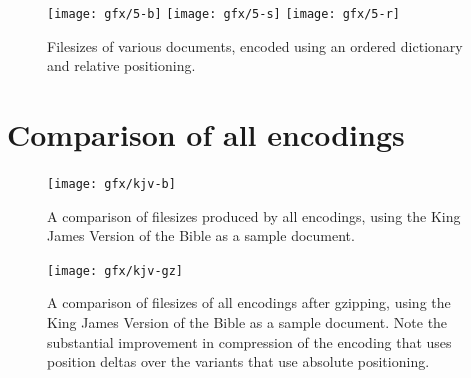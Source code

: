 \begin{figure}
  \begin{center}
  \texttt{[image: gfx/5-b]}
  \texttt{[image: gfx/5-s]}
  \texttt{[image: gfx/5-r]}
  \end{center}
  \caption[Filesizes of documents with an ordered dictionary and relative positioning]{Filesizes of various documents, encoded using an ordered dictionary and relative positioning.}
  \label{fig:size-deltas}
\end{figure}


\section{Comparison of all encodings}

\begin{figure}
  \begin{center}
  \texttt{[image: gfx/kjv-b]}
  \end{center}
  \caption[Comparison of filesizes from all encodings]{A comparison of filesizes produced by all encodings, using the King James Version of the Bible as a sample document.}
  \label{fig:size-all-b}
\end{figure}

\begin{figure}
  \begin{center}
  \texttt{[image: gfx/kjv-gz]}
  \end{center}
  \caption[Comparison of gzipped filesizes from all encodings]{A comparison of filesizes of all encodings after gzipping, using the King James Version of the Bible as a sample document. Note the substantial improvement in compression of the encoding that uses position deltas over the variants that use absolute positioning.}
  \label{fig:size-all-gz}
\end{figure}


